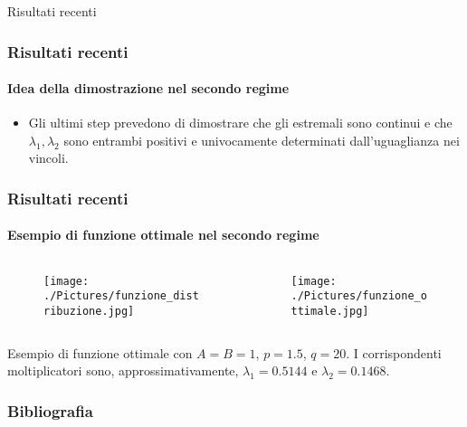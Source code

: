 \documentclass[aspectratio=141]{beamer}
\begin{document}
\begin{section}{Risultati recenti}
	\begin{frame}
		\frametitle{Risultati recenti}
		\framesubtitle{Idea della dimostrazione nel secondo regime}
		\begin{itemize}
			\item Gli ultimi step prevedono di dimostrare che gli estremali sono continui e che $\lambda_1, \lambda_2$ sono entrambi positivi e univocamente determinati dall'uguaglianza nei vincoli.
		\end{itemize}
	\end{frame}

	\begin{frame}
		\frametitle{Risultati recenti}
		\framesubtitle{Esempio di funzione ottimale nel secondo regime}
		\begin{columns}[onlytextwidth,T]
			\begin{column}{.45\linewidth}
				\begin{figure}
					\texttt{[image: ./Pictures/funzione\_distribuzione.jpg]}
				\end{figure}				
			\end{column}
			\begin{column}{.45\linewidth}
				\begin{figure}
					\texttt{[image: ./Pictures/funzione\_ottimale.jpg]}
				\end{figure}	
			\end{column}
		\end{columns}
		Esempio di funzione ottimale con $A=B=1$, $p=1.5$, $q = 20$. I corrispondenti moltiplicatori sono, approssimativamente, $\lambda_1 = 0.5144$ e $\lambda_2 = 0.1468$.
	\end{frame}
	
\end{section}

\begin{frame}[allowframebreaks]
	\frametitle{Bibliografia}
	{\tiny
	\nocite{*}
	\printbibliography}
\end{frame}

\end{document}
